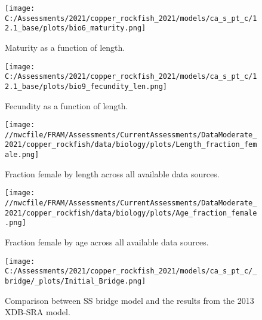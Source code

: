 \documentclass[11pt,
  english,
  a4paper,
]{article}
\begin{document}
\begin{figure}
\centering
\texttt{[image: C:/Assessments/2021/copper\_rockfish\_2021/models/ca\_s\_pt\_c/12.1\_base/plots/bio6\_maturity.png]}
\caption{Maturity as a function of length.\label{fig:maturity}}
\end{figure}

\tagmcend\tagstructend


\begin{figure}
\centering
\texttt{[image: C:/Assessments/2021/copper\_rockfish\_2021/models/ca\_s\_pt\_c/12.1\_base/plots/bio9\_fecundity\_len.png]}
\caption{Fecundity as a function of length.\label{fig:fecundity}}
\end{figure}

\tagmcend\tagstructend


\begin{figure}
\centering
\texttt{[image: //nwcfile/FRAM/Assessments/CurrentAssessments/DataModerate\_2021/copper\_rockfish/data/biology/plots/Length\_fraction\_female.png]}
\caption{Fraction female by length across all available data sources.\label{fig:len-sex-ratio}}
\end{figure}

\tagmcend\tagstructend


\begin{figure}
\centering
\texttt{[image: //nwcfile/FRAM/Assessments/CurrentAssessments/DataModerate\_2021/copper\_rockfish/data/biology/plots/Age\_fraction\_female.png]}
\caption{Fraction female by age across all available data sources.\label{fig:age-sex-ratio}}
\end{figure}

\tagmcend\tagstructend


\begin{figure}
\centering
\texttt{[image: C:/Assessments/2021/copper\_rockfish\_2021/models/ca\_s\_pt\_c/\_bridge/\_plots/Initial\_Bridge.png]}
\caption{Comparison between SS bridge model and the results from the 2013 XDB-SRA model.\label{fig:bridge-1}}
\end{figure}
\end{document}
